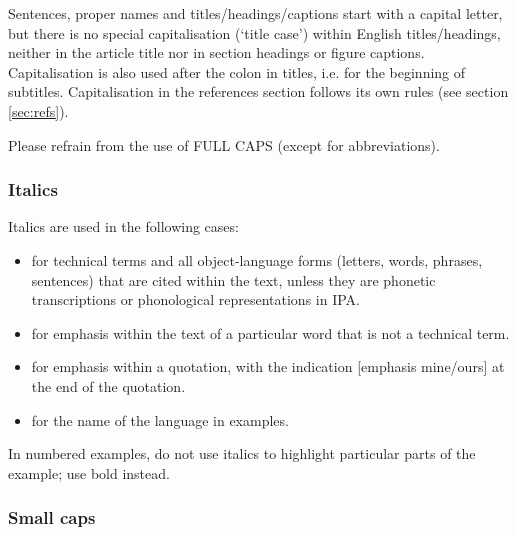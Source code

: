 \documentclass[charis,linguex]{glossa}
\begin{document}
Sentences, proper names and titles/headings/captions start with a capital letter, but there is no special capitalisation (`title case') within English titles/headings, neither in the article title nor in section headings or figure captions. Capitalisation is also used after the colon in titles, i.e. for the beginning of subtitles. Capitalisation in the references section follows its own rules (see section \ref{sec:refs}).


Please refrain from the use of FULL CAPS (except for abbreviations).

\subsubsection{Italics}
Italics are used in the following cases:
\sloppy
\begin{itemize}
\item for technical terms and all object-language forms (letters, words, phrases, sentences) that are cited within the text, unless they are phonetic transcriptions or phonological representations in IPA.
\item for emphasis within the text of a particular word that is not a technical term.
\item for emphasis within a quotation, with the indication [emphasis mine/ours] at the end of the quotation.
\item for the name of the language in examples.
\end{itemize}

In numbered examples, do not use italics to highlight particular parts of the example; use bold instead.

\fussy

\subsubsection{Small caps} 
\end{document}
